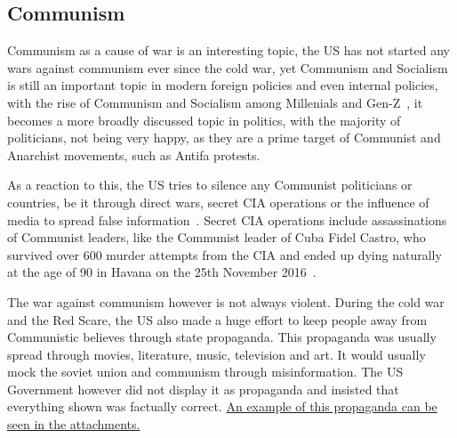 \subsection{Communism}
Communism as a cause of war is an interesting topic, the US has not started any wars against communism ever since the cold war, yet Communism and Socialism is still an important topic in modern foreign policies and even internal policies, with the rise of Communism and Socialism among Millenials and Gen-Z~\autocite{theguardian-genz-capitalism}, it becomes a more broadly discussed topic in politics, with the majority of politicians, not being very happy, as they are a prime target of Communist and Anarchist movements, such as Antifa protests.

As a reaction to this, the US tries to silence any Communist politicians or countries, be it through direct wars, secret CIA operations or the influence of media to spread false information~\autocite{theguardian-anti-communist-usa}. Secret CIA operations include assassinations of Communist leaders, like the Communist leader of Cuba Fidel Castro, who survived over 600 murder attempts from the CIA and ended up dying naturally at the age of 90 in Havana on the 25th November 2016~\autocite{cnn-fidel-castro-assassination}.

The war against communism however is not always violent. During the cold war and the Red Scare, the US also made a huge effort to keep people away from Communistic believes through state propaganda.
This propaganda was usually spread through movies, literature, music, television and art. It would usually mock the soviet union and communism through misinformation. The US Government however did not display it as propaganda and insisted that everything shown was factually correct.
\hyperlink{section.4}{An example of this propaganda can be seen in the attachments.}